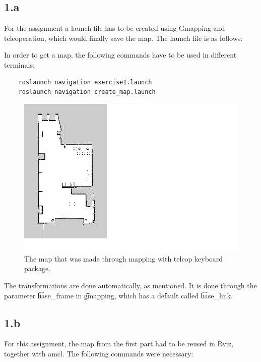 
\subsection*{1.a}
For the assignment a launch file has to be created using Gmapping and teleoperation, which would finally save the map. The launch file is as follows:



In order to get a map, the following commands have to be used in different terminals:

\begin{lstlisting}
	roslaunch navigation exercise1.launch
	roslaunch navigation create_map.launch
\end{lstlisting}

\begin{figure}
	\centering
	\includegraphics[width=\textwidth]{./img/map_teleop.png}
	\caption{The map that was made through mapping with teleop keyboard package.}
	\label{fig:1:map}
\end{figure}

The transformations are done automatically, as mentioned. It is done through the parameter \t{base_frame} in \t{gmapping}, which has a default called \t{base_link}.

\subsection*{1.b}

For this assignment, the map from the first part had to be reused in Rviz, together with amcl. The following commands were necessary:

